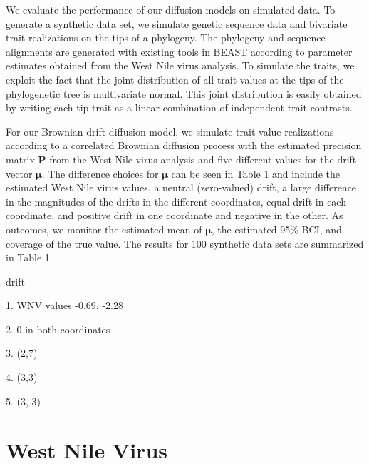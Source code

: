 \documentclass[12pt]{article}
\begin{document}
We evaluate the performance of our diffusion models on simulated data.  To generate a synthetic data set, 
we simulate genetic sequence data and bivariate trait realizations on the tips of a phylogeny.  The phylogeny and
sequence alignments are generated with existing tools in BEAST according to parameter estimates obtained from 
the West Nile virus analysis.  To simulate the traits, we exploit the fact that the joint distribution of all 
trait values at the tips of the phylogenetic tree is multivariate normal.  This joint distribution is easily obtained
by writing each tip trait as a linear combination of independent trait contrasts.
\par
For our Brownian drift diffusion model, we simulate trait value realizations according to a correlated Brownian 
diffusion process with the estimated precision matrix $\textbf{P}$ from the West Nile virus analysis and five different 
values for the drift vector $\boldsymbol \mu$.  The difference choices for $\boldsymbol \mu$ can be seen in Table 1 and
include the estimated West Nile virus values, a neutral (zero-valued) drift, a large difference in 
the magnitudes of the drifts in the different coordinates, equal drift in each coordinate,
and positive drift in one coordinate and negative in the other.  As outcomes, we monitor the estimated mean of 
$\boldsymbol \mu$, the estimated 95$\%$ BCI, and coverage of the true value.  The results for 100 synthetic 
data sets are summarized in Table 1.






drift

1. WNV values -0.69, -2.28


2. 0 in both coordinates

3. (2,7)

4. (3,3)

5. (3,-3)




\section{West Nile Virus} 
\end{document}
